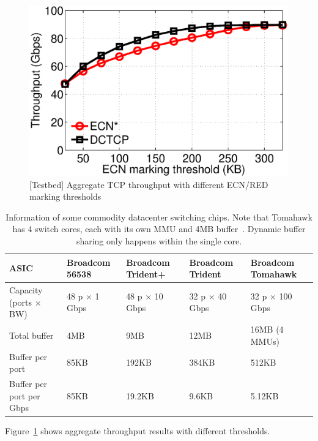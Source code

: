 \begin{figure}[t]
\centering
  \includegraphics[width=0.75\linewidth]{figs/throughput_ecn_threshold.eps}
      \vspace{-1.5mm}
  \caption{[Testbed] Aggregate TCP throughput with different ECN/RED marking thresholds}\label{fig:throughput_ecn_thresh}
    \vspace{-4mm}
\end{figure}
\begin{table}[t]
\small
\centering
\begin{tabular}{|l|l|l|l|l|}
\hline
ASIC & Broadcom 56538 & Broadcom Trident+ & Broadcom Trident \uppercase\expandafter{\romannumeral2} & Broadcom Tomahawk \\\hline
Capacity (ports $\times$ BW) & 48 p $\times$ 1 Gbps & 48 p $\times$ 10 Gbps & 32 p $\times$ 40 Gbps & 32 p $\times$ 100 Gbps \\\hline
Total buffer             & 4MB   & 9MB  & 12MB & 16MB (4 MMUs) \\\hline
Buffer per port          & 85KB  & 192KB  & 384KB & 512KB \\\hline
Buffer per port per Gbps & 85KB  & 19.2KB & 9.6KB & 5.12KB \\\hline
\end{tabular}
\caption{Information of some commodity datacenter switching chips. Note that Tomahawk has 4 switch cores, each with its own MMU and 4MB buffer~\cite{tomahawk_buffer1,tomahawk_buffer2}. Dynamic buffer sharing only happens within the single core.}
\label{tab:chip_buffer}
\vspace{-2mm}
\end{table}
Figure~\ref{fig:throughput_ecn_thresh} shows aggregate throughput results with different thresholds.
